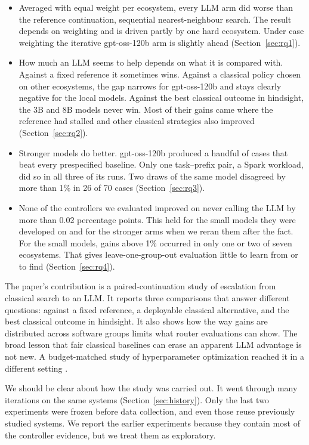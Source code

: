 \begin{itemize}
  \item Averaged with equal weight per ecosystem, every LLM arm did worse than the reference continuation, sequential nearest-neighbour search. The result depends on weighting and is driven partly by one hard ecosystem. Under case weighting the iterative gpt-oss-120b arm is slightly ahead (Section~\ref{sec:rq1}).
  \item How much an LLM seems to help depends on what it is compared with. Against a fixed reference it sometimes wins. Against a classical policy chosen on other ecosystems, the gap narrows for gpt-oss-120b and stays clearly negative for the local models. Against the best classical outcome in hindsight, the 3B and 8B models never win. Most of their gains came where the reference had stalled and other classical strategies also improved (Section~\ref{sec:rq2}).
  \item Stronger models do better. gpt-oss-120b produced a handful of cases that beat every prespecified baseline. Only one task--prefix pair, a Spark workload, did so in all three of its runs. Two draws of the same model disagreed by more than 1\% in 26 of 70 cases (Section~\ref{sec:rq3}).
  \item None of the controllers we evaluated improved on never calling the LLM by more than 0.02 percentage points. This held for the small models they were developed on and for the stronger arms when we reran them after the fact. For the small models, gains above 1\% occurred in only one or two of seven ecosystems. That gives leave-one-group-out evaluation little to learn from or to find (Section~\ref{sec:rq4}).
\end{itemize}

The paper's contribution is a paired-continuation study of escalation from classical search to an LLM. It reports three comparisons that answer different questions: against a fixed reference, a deployable classical alternative, and the best classical outcome in hindsight. It also shows how the way gains are distributed across software groups limits what router evaluations can show. The broad lesson that fair classical baselines can erase an apparent LLM advantage is not new. A budget-matched study of hyperparameter optimization reached it in a different setting \cite{rodrigues2026worth}.

We should be clear about how the study was carried out. It went through many iterations on the same systems (Section~\ref{sec:history}). Only the last two experiments were frozen before data collection, and even those reuse previously studied systems. We report the earlier experiments because they contain most of the controller evidence, but we treat them as exploratory.

